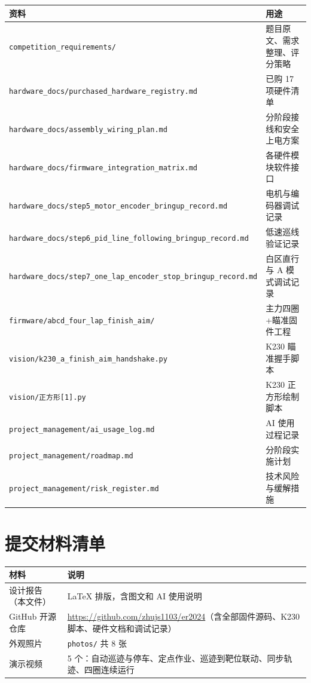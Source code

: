 \documentclass[12pt,a4paper]{ctexart}
\begin{document}
\begin{table}[H]
\centering
\begin{tabular}{@{}lp{10cm}@{}}
\toprule
\textbf{资料} & \textbf{用途} \\
\midrule
\texttt{competition\_requirements/} & 题目原文、需求整理、评分策略 \\
\texttt{hardware\_docs/purchased\_hardware\_registry.md} & 已购 17 项硬件清单 \\
\texttt{hardware\_docs/assembly\_wiring\_plan.md} & 分阶段接线和安全上电方案 \\
\texttt{hardware\_docs/firmware\_integration\_matrix.md} & 各硬件模块软件接口 \\
\texttt{hardware\_docs/step5\_motor\_encoder\_bringup\_record.md} & 电机与编码器调试记录 \\
\texttt{hardware\_docs/step6\_pid\_line\_following\_bringup\_record.md} & 低速巡线验证记录 \\
\texttt{hardware\_docs/step7\_one\_lap\_encoder\_stop\_bringup\_record.md} & 白区直行与 A 模式调试记录 \\
\texttt{firmware/abcd\_four\_lap\_finish\_aim/} & 主力四圈+瞄准固件工程 \\
\texttt{vision/k230\_a\_finish\_aim\_handshake.py} & K230 瞄准握手脚本 \\
\texttt{vision/正方形[1].py} & K230 正方形绘制脚本 \\
\texttt{project\_management/ai\_usage\_log.md} & AI 使用过程记录 \\
\texttt{project\_management/roadmap.md} & 分阶段实施计划 \\
\texttt{project\_management/risk\_register.md} & 技术风险与缓解措施 \\
\bottomrule
\end{tabular}
\end{table}

\section{提交材料清单}

\begin{table}[H]
\centering
\begin{tabular}{@{}ll@{}}
\toprule
\textbf{材料} & \textbf{说明} \\
\midrule
设计报告（本文件） & LaTeX 排版，含图文和 AI 使用说明 \\
GitHub 开源仓库 & \url{https://github.com/zhujs1103/er2024}（含全部固件源码、K230 脚本、硬件文档和调试记录） \\
外观照片 & \texttt{photos/} 共 8 张 \\
演示视频 & 5 个：自动巡迹与停车、定点作业、巡迹到靶位联动、同步轨迹、四圈连续运行\\
\bottomrule
\end{tabular}
\end{table}
\end{document}
